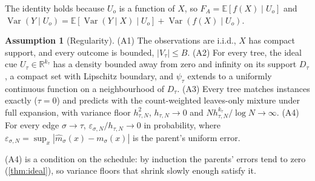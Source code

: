 \documentclass[11pt]{article}
\theoremstyle{definition}
\newtheorem{assumption}[theorem]{Assumption}
\theoremstyle{remark}
\newcommand{\R}{\mathbb{R}}
\newcommand{\E}{\mathbb{E}}
\newcommand{\Var}{\operatorname{Var}}
\begin{document}
The identity holds because $U_o$ is a function of $X$, so $F_A=\E[f(X)\mid U_o]$ and
$\Var(Y\mid U_o)=\E[\Var(Y\mid X)\mid U_o]+\Var(f(X)\mid U_o)$.

\begin{assumption}[Regularity]\label{ass:regular}
(A1) The observations are i.i.d., $X$ has compact support, and every outcome is
bounded, $|V_\tau|\le B$.  (A2) For every tree, the ideal cue
$U_\tau\in\R^{k_\tau}$ has a density bounded away from zero and infinity on its support
$D_\tau$, a compact set with Lipschitz boundary, and $\psi_\tau$ extends to a uniformly
continuous function on a neighbourhood of $D_\tau$.  (A3) Every tree matches instances exactly
($\tau=0$) and predicts with the count-weighted leaves-only mixture under full expansion,
with variance floor $h_{\tau,N}^2$, $h_{\tau,N}\to0$ and
$Nh_{\tau,N}^{k_\tau}/\log N\to\infty$.  (A4) For every edge $\sigma\to\tau$,
$\varepsilon_{\sigma,N}/h_{\tau,N}\to0$ in probability, where
$\varepsilon_{\sigma,N}=\sup_x|\hat m_\sigma(x)-m_\sigma(x)|$ is the parent's uniform
error.
\end{assumption}

(A4) is a condition on the schedule: by induction the parents' errors tend to zero
(\cref{thm:ideal}), so variance floors that shrink slowly enough satisfy it.
\end{document}
